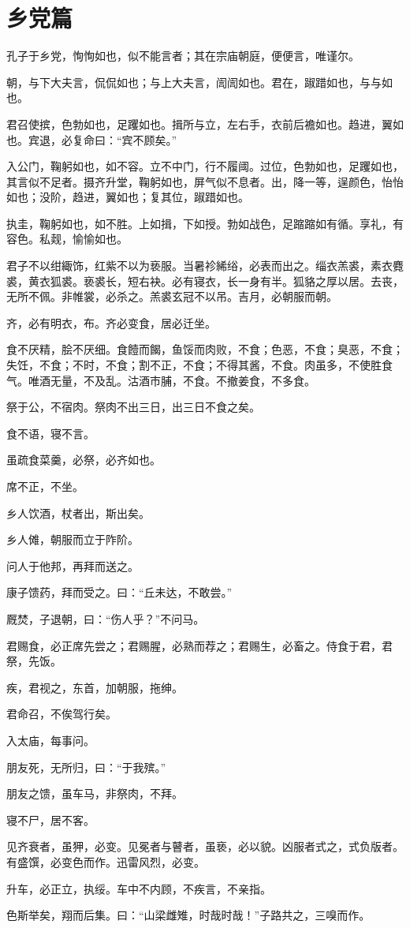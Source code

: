 \documentclass[12pt,a4paper]{ctexbook}
\begin{document}
\section{乡党篇}
孔子于乡党，恂恂如也，似不能言者；其在宗庙朝庭，便便言，唯谨尔。\par
朝，与下大夫言，侃侃如也；与上大夫言，訚訚如也。君在，踧踖如也，与与如也。\par
君召使摈，色勃如也，足躩如也。揖所与立，左右手，衣前后襜如也。趋进，翼如也。宾退，必复命曰：“宾不顾矣。”\par
入公门，鞠躬如也，如不容。立不中门，行不履阈。过位，色勃如也，足躩如也，其言似不足者。摄齐升堂，鞠躬如也，屏气似不息者。出，降一等，逞颜色，怡怡如也；没阶，趋进，翼如也；复其位，踧踖如也。\par
执圭，鞠躬如也，如不胜。上如揖，下如授。勃如战色，足蹜蹜如有循。享礼，有容色。私觌，愉愉如也。\par
君子不以绀緅饰，红紫不以为亵服。当暑袗絺绤，必表而出之。缁衣羔裘，素衣麑裘，黄衣狐裘。亵裘长，短右袂。必有寝衣，长一身有半。狐貉之厚以居。去丧，无所不佩。非帷裳，必杀之。羔裘玄冠不以吊。吉月，必朝服而朝。\par
齐，必有明衣，布。齐必变食，居必迁坐。\par
食不厌精，脍不厌细。食饐而餲，鱼馁而肉败，不食；色恶，不食；臭恶，不食；失饪，不食；不时，不食；割不正，不食；不得其酱，不食。肉虽多，不使胜食气。唯酒无量，不及乱。沽酒市脯，不食。不撤姜食，不多食。\par
祭于公，不宿肉。祭肉不出三日，出三日不食之矣。\par
食不语，寝不言。\par
虽疏食菜羹，必祭，必齐如也。\par
席不正，不坐。\par
乡人饮酒，杖者出，斯出矣。\par
乡人傩，朝服而立于阼阶。\par
问人于他邦，再拜而送之。\par
康子馈药，拜而受之。曰：“丘未达，不敢尝。”\par
厩焚，子退朝，曰：“伤人乎？”不问马。\par
君赐食，必正席先尝之；君赐腥，必熟而荐之；君赐生，必畜之。侍食于君，君祭，先饭。\par
疾，君视之，东首，加朝服，拖绅。\par
君命召，不俟驾行矣。\par
入太庙，每事问。\par
朋友死，无所归，曰：“于我殡。”\par
朋友之馈，虽车马，非祭肉，不拜。\par
寝不尸，居不客。\par
见齐衰者，虽狎，必变。见冕者与瞽者，虽亵，必以貌。凶服者式之，式负版者。有盛馔，必变色而作。迅雷风烈，必变。\par
升车，必正立，执绥。车中不内顾，不疾言，不亲指。\par
色斯举矣，翔而后集。曰：“山梁雌雉，时哉时哉！”子路共之，三嗅而作。\par
\end{document}
